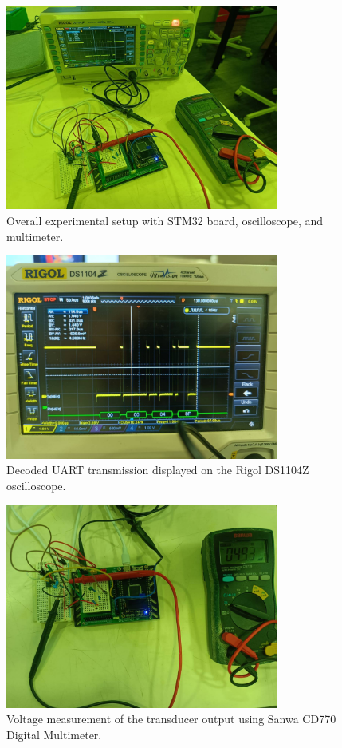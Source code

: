\documentclass[12pt,a4paper]{article}
\begin{document}
\begin{figure}
    \centering
    \includegraphics[width=0.8\textwidth]{images/setup.jpg}
    \caption{Overall experimental setup with STM32 board, oscilloscope, and multimeter.}
    \label{fig:setup}
\end{figure}

\begin{figure}
    \centering
    \includegraphics[width=0.8\textwidth]{images/oscilloscope.jpg}
    \caption{Decoded UART transmission displayed on the Rigol DS1104Z oscilloscope.}
    \label{fig:oscilloscope}
\end{figure}

\begin{figure}
    \centering
    \includegraphics[width=0.8\textwidth]{images/multimeter.jpg}
    \caption{Voltage measurement of the transducer output using Sanwa CD770 Digital Multimeter.}
    \label{fig:multimeter}
\end{figure}
\end{document}
